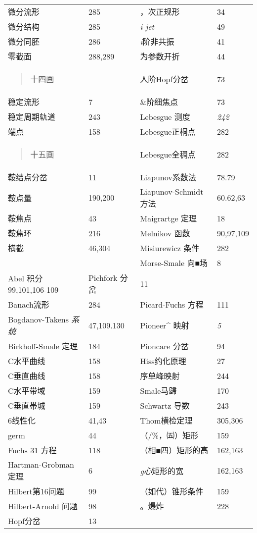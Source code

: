 \documentclass{article}
\begin{document}
\begin{longtable}[]{@{}llll@{}}
\toprule
\endhead
微分流形 & 285 & ，次正规形 & 34\tabularnewline
微分结构 & 285 & \emph{i-jet} & 49\tabularnewline
微分同胚 & 286 & \emph{i}阶非共振 & 41\tabularnewline
零截面 & 288,289 & 为参数开折 & 44\tabularnewline
\begin{minipage}[t]{0.22\columnwidth}\raggedright
\begin{quote}
十四画
\end{quote}\strut
\end{minipage} & \begin{minipage}[t]{0.22\columnwidth}\raggedright
\strut
\end{minipage} & \begin{minipage}[t]{0.22\columnwidth}\raggedright
人阶Hopf分岔\strut
\end{minipage} & \begin{minipage}[t]{0.22\columnwidth}\raggedright
73\strut
\end{minipage}\tabularnewline
稳定流形 & 7 & \&阶细焦点 & 73\tabularnewline
稳定周期轨道 & 243 & Lebesgue 测度 & \emph{242}\tabularnewline
端点 & 158 & Lebesgue正桐点 & 282\tabularnewline
\begin{minipage}[t]{0.22\columnwidth}\raggedright
\begin{quote}
十五画
\end{quote}\strut
\end{minipage} & \begin{minipage}[t]{0.22\columnwidth}\raggedright
\strut
\end{minipage} & \begin{minipage}[t]{0.22\columnwidth}\raggedright
Lebesgue全稠点\strut
\end{minipage} & \begin{minipage}[t]{0.22\columnwidth}\raggedright
282\strut
\end{minipage}\tabularnewline
鞍结点分岔 & 11 & Liapunov系数法 & 78.79\tabularnewline
鞍点量 & 190,200 & Liapunov-Schmidt 方法 & 60.62,63\tabularnewline
鞍焦点 & 43 & Maigrartge 定理 & 18\tabularnewline
鞍焦环 & 216 & Melnikov 函数 & 90,97,109\tabularnewline
横截 & 46,304 & Misiurewicz 条件 & 282\tabularnewline
& & Morse-Smale 向■场 & 8\tabularnewline
Abel 积分 99,101,106-109 & Pichfork 分岔 & 11 &\tabularnewline
Banach流形 & 284 & Picard-Fuchs 方程 & 111\tabularnewline
Bogdanov-Takens \emph{系统} & 47,109.130 & Pioneer\^{} 映射 &
\emph{5}\tabularnewline
Birkhoff-Smale 定理 & 184 & Pioncare 分岔 & 94\tabularnewline
C水平曲线 & 158 & Hiss约化原理 & 27\tabularnewline
C垂直曲线 & 158 & 序单峰映射 & 244\tabularnewline
C水平带域 & 159 & Smale马歸 & 170\tabularnewline
C垂直帯城 & 159 & Schwartz 导数 & 243\tabularnewline
6线性化 & 41,43 & Thom横检定理 & 305,306\tabularnewline
germ & 44 & （/\%，㈤）矩形 & 159\tabularnewline
Fuchs 31 方程 & 118 & （相■四）矩形的高 & 162,163\tabularnewline
Hartman-Grobman 定理 & 6 & \emph{g心}矩形的宽 & 162,163\tabularnewline
Hilbert第16问题 & 99 & （如代）锥形条件 & 159\tabularnewline
Hilbert-Arnold 问题 & 98 & 。爆炸 & 228\tabularnewline
Hopf分岔 & 13 & &\tabularnewline
\bottomrule
\end{longtable}
\end{document}
